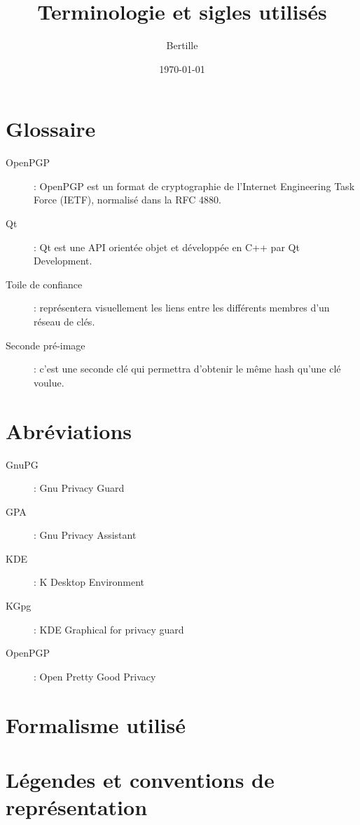 \documentclass{../res/univ-projet}
\title{Terminologie et sigles utilisés}
\author{Bertille \bsc{Bouillie}}
\date{\today}
\begin{document}
\maketitle
\newpage
\tableofcontents
\newpage


\section{Glossaire}

\begin{description}
 \item[OpenPGP] : OpenPGP est un format de cryptographie de l'Internet Engineering Task Force (IETF), normalisé dans la RFC 4880.\\
 \item[Qt] : Qt est une API orientée objet et développée en C++ par Qt Development.\\
 \item[Toile de confiance] : représentera visuellement les liens entre les différents membres d'un réseau de clés.\\
 \item[Seconde pré-image] : c'est une seconde clé qui permettra d'obtenir le même hash qu'une clé voulue.	\\
\end{description}



\section{Abréviations}

\begin{description}
 \item[GnuPG] : Gnu Privacy Guard\\
 \item[GPA] : Gnu Privacy Assistant\\
 \item[KDE] : K Desktop Environment\\
 \item[KGpg] : KDE Graphical for privacy guard\\
 \item[OpenPGP] : Open Pretty Good Privacy\\
\end{description}



\section{Formalisme utilisé}

\begin{description}
 \item 
\end{description}



\section{Légendes et conventions de représentation}

\begin{description}
 \item 
\end{description}
\end{document}
